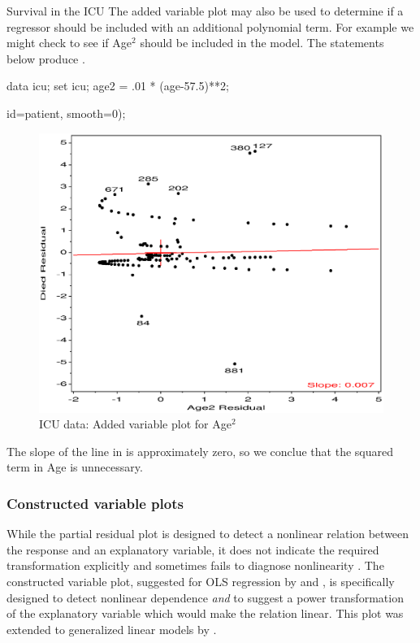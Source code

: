 \begin{Example}[icu3]{Survival in the ICU}
The added variable plot may also be used to determine if a regressor
should be included with an additional polynomial term.
For example we might check to see if Age${}^2$ should be included
in the model.  The statements below produce .
\begin{listing}
data icu;
   set icu;
   age2 = .01 * (age-57.5)**2;

   id=patient, smooth=0);
\end{listing}

\begin{figure}[htb]
  \centering
  \includegraphics[scale=.6]{ch6/fig/icu62}
  \caption{ICU data: Added variable plot for Age${}^2$}%
  \label{fig:icu62}
\end{figure}
The slope of the line in  is approximately zero,
so we conclue that the squared term in Age is unnecessary.
\end{Example}

\subsubsection{Constructed variable plots}
While the partial residual plot is designed to detect a nonlinear relation
between the response and an explanatory variable,
it does not indicate the required transformation explicitly
and sometimes fails to diagnose nonlinearity
\citep{FienbergGong:84}.
The constructed variable plot, suggested for OLS regression
by \citet{Atkinson:81} and
\citet[\S 2.4.4]{CookWeisberg:82}, is specifically designed to
detect nonlinear dependence \emph{and} to suggest a power transformation
of the explanatory variable which would make the relation linear.
This plot was extended to generalized linear models by
\citet{WangP:87}.

